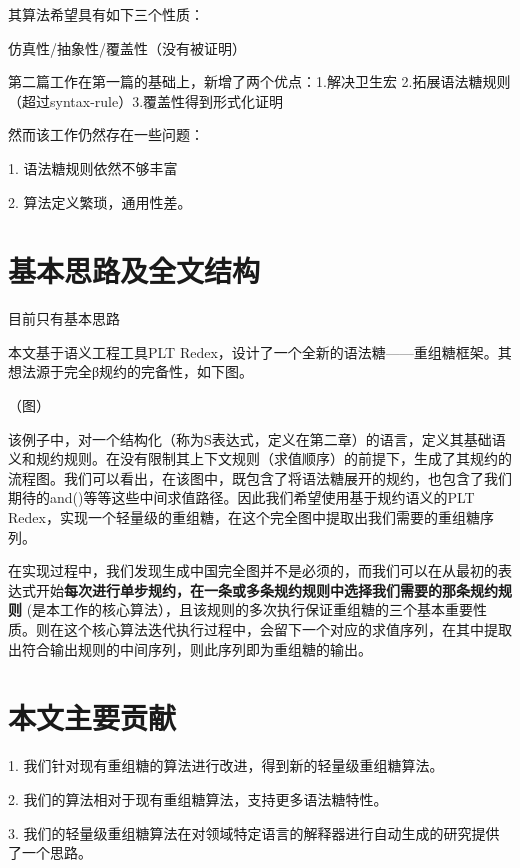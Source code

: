 其算法希望具有如下三个性质：

仿真性/抽象性/覆盖性（没有被证明）

第二篇工作在第一篇的基础上，新增了两个优点：1.解决卫生宏 2.拓展语法糖规则（超过syntax-rule）3.覆盖性得到形式化证明

然而该工作仍然存在一些问题：

1.	语法糖规则依然不够丰富

2.	算法定义繁琐，通用性差。
\section{基本思路及全文结构}
目前只有基本思路

本文基于语义工程工具PLT Redex，设计了一个全新的语法糖——重组糖框架。其想法源于完全β规约的完备性，如下图。

（图）

该例子中，对一个结构化（称为S表达式，定义在第二章）的语言，定义其基础语义和规约规则。在没有限制其上下文规则（求值顺序）的前提下，生成了其规约的流程图。我们可以看出，在该图中，既包含了将语法糖展开的规约，也包含了我们期待的and()等等这些中间求值路径。因此我们希望使用基于规约语义的PLT Redex，实现一个轻量级的重组糖，在这个完全图中提取出我们需要的重组糖序列。

在实现过程中，我们发现生成中国完全图并不是必须的，而我们可以在从最初的表达式开始{\bfseries 每次进行单步规约，在一条或多条规约规则中选择我们需要的那条规约规则 }(是本工作的核心算法），且该规则的多次执行保证重组糖的三个基本重要性质。则在这个核心算法迭代执行过程中，会留下一个对应的求值序列，在其中提取出符合输出规则的中间序列，则此序列即为重组糖的输出。

\section{本文主要贡献}
1.	我们针对现有重组糖的算法进行改进，得到新的轻量级重组糖算法。

2.	我们的算法相对于现有重组糖算法，支持更多语法糖特性。

3.	我们的轻量级重组糖算法在对领域特定语言的解释器进行自动生成的研究提供了一个思路。


